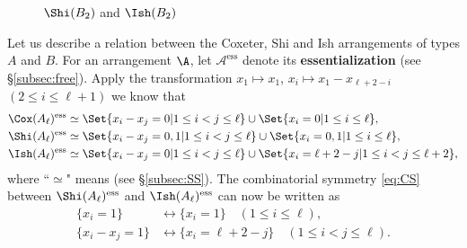   \begin{figure}[htbp!]
\centering
\begin{subfigure}{.5\textwidth}
  \centering
{}
 \end{subfigure}%
\begin{subfigure}{.5\textwidth}
  \centering
{}
 \end{subfigure}%
\caption{$\Shi(B_2)$ and $\Ish(B_2)$}
\label{fig:Shi Ish B2}
\end{figure}



Let us describe a relation between the Coxeter, Shi and Ish arrangements of types $A$ and $B$. 
For an arrangement $\A$, let $ \mathcal{A}^{\mathrm{ess}} $  denote its \textbf{essentialization} (see \S\ref{subsec:free}). 
Apply the transformation $x_1 \mapsto x_1$, $x_i \mapsto x_1-x_{\ell+2-i}$ $(2 \le i \le \ell +1)$ we know that
\begin{align*}
\Cox(A_{\ell})^{\mathrm{ess}} &\simeq \Set{x_{i}-x_{j} = 0 | 1 \leq i < j \leq \ell} \cup \Set{x_{i} = 0 | 1 \leq i \leq \ell}, \\
\Shi(A_{\ell})^{\mathrm{ess}} &\simeq \Set{x_{i}-x_{j} = 0,1 | 1 \leq i < j \leq \ell} \cup \Set{x_{i} = 0,1 | 1 \leq i \leq \ell}, \\
\Ish(A_{\ell})^{\mathrm{ess}} &\simeq \Set{x_{i}-x_{j} = 0 | 1 \leq i < j \leq \ell} \cup \Set{x_{i} = \ell+2-j | 1 \leq i < j \leq \ell+2},
\end{align*}
where ``$\simeq$" means  (see \S\ref{subsec:SS}). 
The combinatorial symmetry \eqref{eq:CS} between $\Shi(A_{\ell})^{\mathrm{ess}}$ and $\Ish(A_{\ell})^{\mathrm{ess}}$ can now be written as
\begin{equation}
\label{eq:RCS}
\begin{aligned}
\{x_{i} = 1\} &\longleftrightarrow \{x_{i} = 1\} \quad (1 \leq i \leq \ell), \\
\{x_{i}-x_{j}= 1\} &\longleftrightarrow \{ x_{i} = \ell+2-j\}  \quad (1 \leq i < j \leq \ell). 
\end{aligned}
\end{equation}


